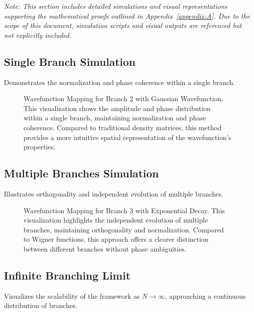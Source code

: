 \documentclass[12pt]{article}
\begin{document}
\textit{Note: This section includes detailed simulations and visual representations supporting the mathematical proofs outlined in Appendix~\ref{appendix:A}. Due to the scope of this document, simulation scripts and visual outputs are referenced but not explicitly included.}

\subsection{Single Branch Simulation}
Demonstrates the normalization and phase coherence within a single branch.

\begin{figure}[h!]
    \centering
    \caption{Wavefunction Mapping for Branch 2 with Gaussian Wavefunction. This visualization shows the amplitude and phase distribution within a single branch, maintaining normalization and phase coherence. Compared to traditional density matrices, this method provides a more intuitive spatial representation of the wavefunction's properties.}
    \label{fig:gaussian_wavefunction}
\end{figure}

\subsection{Multiple Branches Simulation}
Illustrates orthogonality and independent evolution of multiple branches.

\begin{figure}[h!]
    \centering
    \caption{Wavefunction Mapping for Branch 3 with Exponential Decay. This visualization highlights the independent evolution of multiple branches, maintaining orthogonality and normalization. Compared to Wigner functions, this approach offers a clearer distinction between different branches without phase ambiguities.}
    \label{fig:exponential_wavefunction}
\end{figure}

\subsection{Infinite Branching Limit}
Visualizes the scalability of the framework as \(N \rightarrow \infty\), approaching a continuous distribution of branches.
\end{document}
